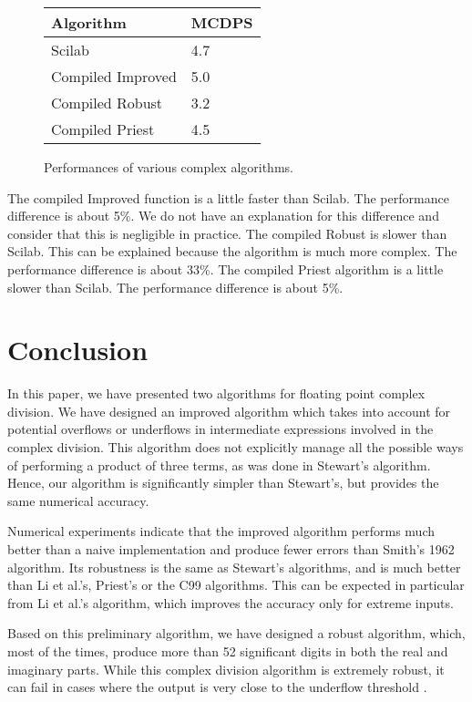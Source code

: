 \documentclass{paper}
\begin{document}
\begin{figure}
\caption{
Performances of various complex algorithms. 
}
\label{fig-perfcompdivMCDPS}
\begin{center}
\begin{tabular}{|l|l|}
\hline
\textbf{Algorithm} & \textbf{MCDPS} \\
\hline
Scilab             & 4.7 \\
Compiled Improved  & 5.0 \\
Compiled Robust    & 3.2 \\
Compiled Priest    & 4.5 \\
\hline
\end{tabular}
\end{center}
\end{figure}

The compiled Improved function is a little faster 
than Scilab. 
The performance difference is about 5\%. 
We do not have an explanation for this difference and consider that this 
is negligible in practice.
The compiled Robust is slower than Scilab.  
This can be explained because the algorithm is much more 
complex. 
The performance difference is about 33\%.
The compiled Priest algorithm is a little slower than Scilab. 
The performance difference is about 5\%.


\section{Conclusion}

In this paper, we have presented two algorithms for floating point 
complex division. 
We have designed an improved algorithm which takes into account 
for potential overflows or underflows in intermediate expressions 
involved in the complex division. 
This algorithm does not explicitly manage all the 
possible ways of performing a product of three terms, as was 
done in Stewart's algorithm. 
Hence, our algorithm is significantly simpler than 
Stewart's, but provides the same numerical accuracy.

Numerical experiments indicate that the improved algorithm 
performs much better than a naive implementation and produce 
fewer errors than Smith's 1962 algorithm. 
Its robustness is the same as Stewart's algorithms, and 
is much better than Li et al.'s, Priest's or the C99 algorithms.
This can be expected in particular from Li et al.'s algorithm, 
which improves the accuracy only for extreme inputs.

Based on this preliminary algorithm, we have designed a 
robust algorithm, which, most of the times, 
produce more than 52 significant digits in both the real 
and imaginary parts. 
While this complex division algorithm is extremely 
robust, it can fail in cases where the output is 
very close to the underflow threshold .
\end{document}
